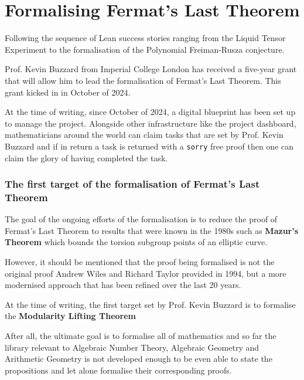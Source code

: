 \section{Formalising Fermat's Last Theorem}

Following the sequence of Lean success stories ranging from the Liquid Tensor Experiment to the formalisation of the Polynomial Freiman-Rusza conjecture. 

Prof. Kevin Buzzard from Imperial College London has received a five-year grant that will allow him to lead the formalisation of Fermat's Last Theorem. This grant kicked in in October of 2024. 

At the time of writing, since October of 2024, a digital blueprint has been set up to manage the project. Alongside other infrastructure like the project dashboard, mathematicians around the world can 
claim tasks that are set by Prof. Kevin Buzzard and if in return a task is returned with a \texttt{sorry} free proof then one can claim the glory of having completed the task.

\subsubsection{The first target of the formalisation of Fermat's Last Theorem}

The goal of the ongoing efforts of the formalisation is to reduce the proof of Fermat's Last Theorem to results that were known in the 1980s such as \textbf{Mazur's Theorem} 
which bounds the torsion subgroup points of an elliptic curve.

However, it should be mentioned that the proof being formalised is not the original proof Andrew Wiles and Richard Taylor provided in 1994, 
but a more modernised approach that has been refined over the last 20 years.

At the time of writing, the first target set by Prof. Kevin Buzzard is to formalise the \textbf{Modularity Lifting Theorem}



After all, the ultimate goal is to formalise all of mathematics and so far the library relevant to Algebraic Number Theory, Algebraic Geometry and Arithmetic Geometry is not developed enough
to be even able to state the propositions and let alone formalise their corresponding proofs.

